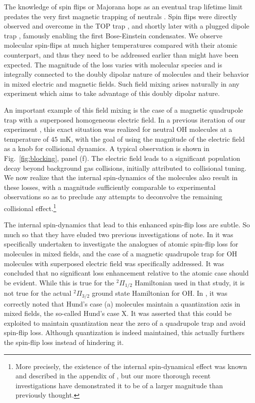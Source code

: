 \documentclass[%
 reprint,
 amsmath,amssymb,
 aps,
prl,
]{revtex4-1}
\begin{document}
The knowledge of spin flips or Majorana hops as an eventual trap lifetime limit predates the very first magnetic trapping of neutrals \cite{Migdall1985}. Spin flips were directly observed and overcome in the TOP trap \cite{Petrich1995}, and shortly later with a plugged dipole trap \cite{Davis1995}, famously enabling the first Bose-Einstein condensates. We observe molecular spin-flips at much higher temperatures compared with their atomic counterpart, and thus they need to be addressed earlier than might have been expected. The magnitude of the loss varies with molecular species and is integrally connected to the doubly dipolar nature of molecules and their behavior in mixed electric and magnetic fields. Such field mixing arises naturally in any experiment which aims to take advantage of this doubly dipolar nature. 

An important example of this field mixing is the case of a magnetic quadrupole trap with a superposed homogeneous electric field. In a previous iteration of our experiment \cite{Stuhl2013}, this exact situation was realized for neutral OH molecules at a temperature of $45$ mK, with the goal of using the magnitude of the electric field as a knob for collisional dynamics. A typical observation is shown in Fig.~\ref{fig:blocking}, panel (f). The electric field leads to a significant population decay beyond background gas collisions, initially attributed to collisional tuning. We now realize that the internal spin-dynamics of the molecules also result in these losses, with a magnitude sufficiently comparable to experimental observations so as to preclude any attempts to deconvolve the remaining collisional effect.\footnote{More precisely, the existence of the internal spin-dynamical effect was known and described in the appendix of \cite{Stuhl2013}, but our more thorough recent investigations have demonstrated it to be of a larger magnitude than previously thought.} 

The internal spin-dynamics that lead to this enhanced spin-flip loss are subtle. So much so that they have eluded two previous investigations of note. In \cite{Lara2008} it was specifically undertaken to investigate the analogues of atomic spin-flip loss for molecules in mixed fields, and the case of a magnetic quadrupole trap for OH molecules with superposed electric field was specifically addressed. It was concluded that no significant loss enhancement relative to the atomic case should be evident. While this is true for the $^2\Pi_{1/2}$ Hamiltonian used in that study, it is not true for the actual $^2\Pi_{3/2}$ ground state Hamiltonian for OH. In \cite{Bohn2013}, it was correctly noted that Hund's case (a) molecules maintain a quantization axis in mixed fields, the so-called Hund's case X. It was asserted that this could be exploited to maintain quantization near the zero of a quadrupole trap and avoid spin-flip loss. Although quantization is indeed maintained, this actually furthers the spin-flip loss instead of hindering it. 
\end{document}
